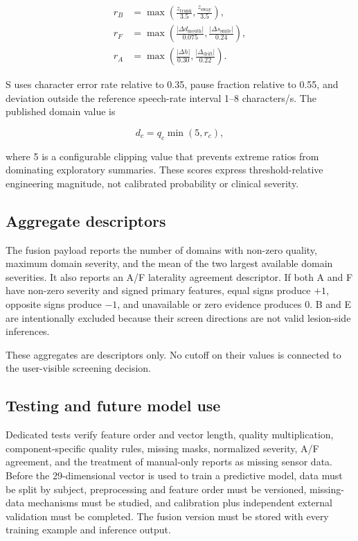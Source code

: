 \documentclass[11pt,a4paper]{article}
\begin{document}
\begin{align}
r_B &= \max\left(\frac{z_{\mathrm{trunk}}}{3.5},\frac{z_{\mathrm{sway}}}{3.5}\right),\\
r_F &= \max\left(\frac{|\Delta d_{\mathrm{mouth}}|}{0.075},
\frac{|\Delta s_{\mathrm{smile}}|}{0.24}\right),\\
r_A &= \max\left(\frac{|\Delta h|}{0.30},
\frac{|\Delta_{\mathrm{drift}}|}{0.22}\right).
\end{align}

S uses character error rate relative to 0.35, pause fraction relative to 0.55, and deviation outside the reference speech-rate interval 1--8 characters/s. The published domain value is

\begin{equation}
d_c=q_c\min(5,r_c),
\end{equation}

where 5 is a configurable clipping value that prevents extreme ratios from dominating exploratory summaries. These scores express threshold-relative engineering magnitude, not calibrated probability or clinical severity.

\subsection{Aggregate descriptors}

The fusion payload reports the number of domains with non-zero quality, maximum domain severity, and the mean of the two largest available domain severities. It also reports an A/F laterality agreement descriptor. If both A and F have non-zero severity and signed primary features, equal signs produce $+1$, opposite signs produce $-1$, and unavailable or zero evidence produces 0. B and E are intentionally excluded because their screen directions are not valid lesion-side inferences.

These aggregates are descriptors only. No cutoff on their values is connected to the user-visible screening decision.

\subsection{Testing and future model use}

Dedicated tests verify feature order and vector length, quality multiplication, component-specific quality rules, missing masks, normalized severity, A/F agreement, and the treatment of manual-only reports as missing sensor data. Before the 29-dimensional vector is used to train a predictive model, data must be split by subject, preprocessing and feature order must be versioned, missing-data mechanisms must be studied, and calibration plus independent external validation must be completed. The fusion version must be stored with every training example and inference output.
\end{document}
